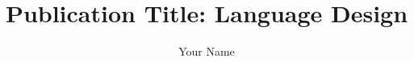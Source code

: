 \documentclass[noarxiv]{../../latex_styles/quantum/quantumarticle}
\begin{document}
\title{Publication Title: Language Design}
\author{Your Name}

\maketitle



\printbibliography
\end{document}
